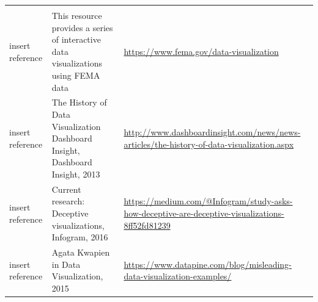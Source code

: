 \documentclass[]{book}
\begin{document}
\begin{longtable}[]{@{}lll@{}}
\begin{minipage}[t]{0.07\columnwidth}
\end{minipage}\tabularnewline
\begin{minipage}[t]{0.07\columnwidth}\raggedright
insert reference\strut
\end{minipage} & \begin{minipage}[t]{0.77\columnwidth}\raggedright
This resource provides a series of interactive data visualizations using FEMA data\strut
\end{minipage} & \begin{minipage}[t]{0.07\columnwidth}\raggedright
\url{https://www.fema.gov/data-visualization}\strut
\end{minipage}\tabularnewline
\begin{minipage}[t]{0.07\columnwidth}\raggedright
insert reference\strut
\end{minipage} & \begin{minipage}[t]{0.77\columnwidth}\raggedright
The History of Data Visualization Dashboard Insight, Dashboard Insight, 2013\strut
\end{minipage} & \begin{minipage}[t]{0.07\columnwidth}\raggedright
\url{http://www.dashboardinsight.com/news/news-articles/the-history-of-data-visualization.aspx}\strut
\end{minipage}\tabularnewline
\begin{minipage}[t]{0.07\columnwidth}\raggedright
insert reference\strut
\end{minipage} & \begin{minipage}[t]{0.77\columnwidth}\raggedright
Current research: Deceptive visualizations, Infogram, 2016\strut
\end{minipage} & \begin{minipage}[t]{0.07\columnwidth}\raggedright
\url{https://medium.com/@Infogram/study-asks-how-deceptive-are-deceptive-visualizations-8ff52fd81239}\strut
\end{minipage}\tabularnewline
\begin{minipage}[t]{0.07\columnwidth}\raggedright
insert reference\strut
\end{minipage} & \begin{minipage}[t]{0.77\columnwidth}\raggedright
Agata Kwapien in Data Visualization, 2015\strut
\end{minipage} & \begin{minipage}[t]{0.07\columnwidth}\raggedright
\url{https://www.datapine.com/blog/misleading-data-visualization-examples/}\strut
\end{minipage}\tabularnewline

\end{longtable}
\end{document}
